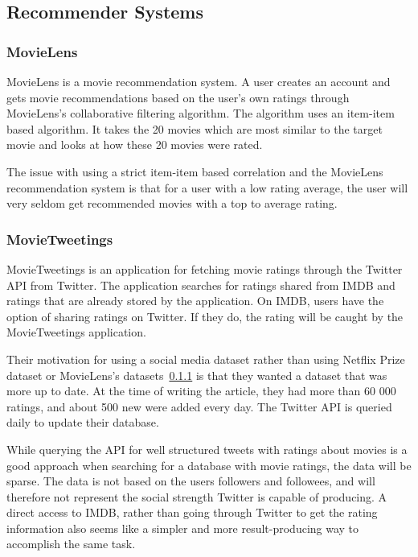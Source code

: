 \subsection{Recommender Systems}
\subsubsection{MovieLens}\label{subsec:MovieLens}
MovieLens is a movie recommendation system. A user creates an account and gets movie recommendations based on the user's own ratings through MovieLens's collaborative filtering algorithm. The algorithm uses an item-item based algorithm. It takes the 20 movies which are most similar to the target movie and looks at how these 20 movies were rated.\cite{grouplens}

The issue with using a strict item-item based correlation and the MovieLens recommendation system is that for a user with a low rating average, the user will very seldom get recommended movies with a top to average rating.


\subsubsection{MovieTweetings}\label{subsec:MovieTweetings}
MovieTweetings is an application for fetching movie ratings through the Twitter API from Twitter. The application searches for ratings shared from IMDB and ratings that are already stored by the application. On IMDB, users have the option of sharing ratings on Twitter. If they do, the rating will be caught by the MovieTweetings application.

Their motivation for using a social media dataset rather than using Netflix Prize dataset or MovieLens's datasets~\ref{subsec:MovieLens} is that they wanted a dataset that was more up to date. At the time of writing the article, they had more than 60 000 ratings, and about 500 new were added every day\cite{MovieTweetings}. The Twitter API is queried daily to update their database.

While querying the API for well structured tweets with ratings about movies is a good approach when searching for a database with movie ratings, the data will be sparse. The data is not based on the users followers and followees, and will therefore not represent the social strength Twitter is capable of producing. A direct access to IMDB, rather than going through Twitter to get the rating information also seems like a simpler and more result-producing way to accomplish the same task.


